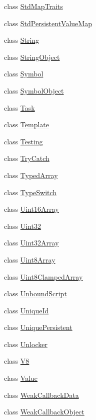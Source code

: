 \begin{DoxyCompactItemize}
\item 
class \hyperlink{classv8_1_1_std_map_traits}{Std\+Map\+Traits}
\item 
class \hyperlink{classv8_1_1_std_persistent_value_map}{Std\+Persistent\+Value\+Map}
\item 
class \hyperlink{classv8_1_1_string}{String}
\item 
class \hyperlink{classv8_1_1_string_object}{String\+Object}
\item 
class \hyperlink{classv8_1_1_symbol}{Symbol}
\item 
class \hyperlink{classv8_1_1_symbol_object}{Symbol\+Object}
\item 
class \hyperlink{classv8_1_1_task}{Task}
\item 
class \hyperlink{classv8_1_1_template}{Template}
\item 
class \hyperlink{classv8_1_1_testing}{Testing}
\item 
class \hyperlink{classv8_1_1_try_catch}{Try\+Catch}
\item 
class \hyperlink{classv8_1_1_typed_array}{Typed\+Array}
\item 
class \hyperlink{classv8_1_1_type_switch}{Type\+Switch}
\item 
class \hyperlink{classv8_1_1_uint16_array}{Uint16\+Array}
\item 
class \hyperlink{classv8_1_1_uint32}{Uint32}
\item 
class \hyperlink{classv8_1_1_uint32_array}{Uint32\+Array}
\item 
class \hyperlink{classv8_1_1_uint8_array}{Uint8\+Array}
\item 
class \hyperlink{classv8_1_1_uint8_clamped_array}{Uint8\+Clamped\+Array}
\item 
class \hyperlink{classv8_1_1_unbound_script}{Unbound\+Script}
\item 
class \hyperlink{classv8_1_1_unique_id}{Unique\+Id}
\item 
class \hyperlink{classv8_1_1_unique_persistent}{Unique\+Persistent}
\item 
class \hyperlink{classv8_1_1_unlocker}{Unlocker}
\item 
class \hyperlink{classv8_1_1_v8}{V8}
\item 
class \hyperlink{classv8_1_1_value}{Value}
\item 
class \hyperlink{classv8_1_1_weak_callback_data}{Weak\+Callback\+Data}
\item 
class \hyperlink{classv8_1_1_weak_callback_object}{Weak\+Callback\+Object}
\end{DoxyCompactItemize}
